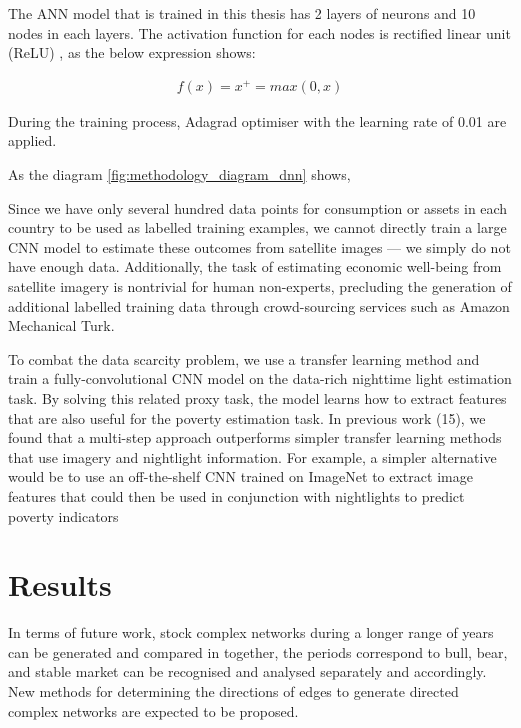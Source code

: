 The ANN model that is trained in this thesis has 2 layers of neurons and 10 nodes in each layers. The activation function for each nodes is rectified linear unit (ReLU) \cite{hahnloser2000digital}, as the below expression shows:

\begin{eqnarray}
f\left(x\right)=x^+=max\left(0,x\right)
\end{eqnarray}

During the training process, Adagrad optimiser \cite{duchi2011adaptive} with the learning rate of 0.01 are applied.

As the diagram \ref{fig:methodology_diagram_dnn} shows, 

Since we have only several hundred data points for consumption or assets in each country to be used as labelled training examples, we cannot directly train a large CNN model to estimate these outcomes from satellite images — we simply do not have enough data. Additionally, the task of estimating economic well-being from satellite imagery is nontrivial for human non-experts, precluding the generation of additional labelled training data through crowd-sourcing services such as Amazon Mechanical Turk.

To combat the data scarcity problem, we use a transfer learning method and train a fully-convolutional CNN model on the data-rich nighttime light estimation task. By solving this related proxy task, the model learns how to extract features that are also useful for the poverty estimation task. In previous work (15), we found that a multi-step approach outperforms simpler transfer learning methods that use imagery and nightlight information. For example, a simpler alternative would be to use an off-the-shelf CNN trained on ImageNet to extract image features that could then be used in conjunction with nightlights to predict poverty indicators



\section{Results}
In terms of future work, stock complex networks during a longer range of years can be generated and compared in together, the periods correspond to bull, bear, and stable market can be recognised and analysed separately and accordingly. New methods for determining the directions of edges to generate directed complex networks are expected to be proposed.

